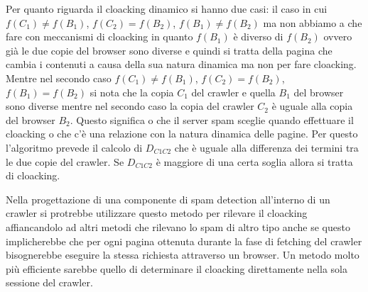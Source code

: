 Per quanto riguarda il cloacking dinamico si hanno due casi: il caso in cui \(f(C_1)\not=f(B_1)\), \(f(C_2)=f(B_2)\), \(f(B_1)\not=f(B_2)\) ma non abbiamo a che fare con meccanismi di cloacking in quanto \(f(B_1)\) è diverso di \(f(B_2)\) ovvero già le due copie del browser sono diverse e quindi si tratta della pagina che cambia i contenuti a causa della sua natura dinamica ma non per fare cloacking. Mentre nel secondo caso \(f(C_1)\not=f(B_1)\), \(f(C_2)=f(B_2)\), \(f(B_1)=f(B_2)\) si nota che la copia \(C_1\) del crawler e quella \(B_1\) del browser sono diverse mentre nel secondo caso la copia del crawler \(C_2\) è uguale alla copia del browser \(B_2\). Questo significa o che il server spam sceglie quando effettuare il cloacking o che c'è una relazione con la natura dinamica delle pagine. Per questo l'algoritmo prevede il calcolo di \(D_{C1C2}\) che è uguale alla differenza dei termini tra le due copie del crawler. Se \(D_{C1C2}\) è maggiore di una certa soglia allora si tratta di cloacking.

Nella progettazione di una componente di spam detection all'interno di un crawler si protrebbe utilizzare questo metodo per rilevare il cloacking affiancandolo ad altri metodi che rilevano lo spam di altro tipo anche se questo implicherebbe che per ogni pagina ottenuta durante la fase di fetching del crawler bisognerebbe eseguire la stessa richiesta attraverso un browser. Un metodo molto più efficiente sarebbe quello di determinare il cloacking direttamente nella sola sessione del crawler.

